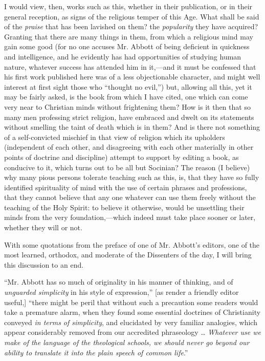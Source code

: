 I would view, then, works such as this, whether
in their publication, or in their general reception, as signs of the
religious temper of this Age. What shall be said of the \emph{praise}
that has been lavished on them? the \emph{popularity} they have
acquired? Granting that there are many things in them, from which a
religious mind may gain some good (for no one accuses Mr. Abbott of
being deficient in quickness and intelligence, and he evidently has
had opportunities of studying human nature, whatever success has
attended him in it,—and it must be confessed that his first work
published here was of a less objectionable character, and might well
interest at first sight those who ``thought no evil,'') but,
allowing all this, yet it may be fairly asked, is the book from which
I have cited, one which can come very near to Christian minds without
frightening them? How is it then that so many men professing strict
religion, have embraced and dwelt on its statements without smelling
the taint of death which is in them? And is there not something of a
self-convicted mischief in that view of religion which its upholders
(independent of each other, and disagreeing with each other materially
in other points of doctrine and discipline) attempt to support by
editing a book, as conducive to it, which turns out to be all but
Socinian? The reason (I believe) why many pious persons tolerate
teaching such as this, is, that they have so fully identified
spirituality of mind with the use of certain phrases and professions,
that they cannot believe that any one whatever can use them freely
without the teaching of the Holy Spirit: to believe it otherwise,
would be unsettling their minds from the very foundation,—which
indeed must take place sooner or later, whether they will or not.

With some quotations from the preface of one of
Mr. Abbott's editors, one of the most learned, orthodox, and
moderate of the Dissenters of the day, I will bring this discussion to
an end.

``Mr. Abbott has so much of originality in his
manner of thinking, and of \emph{unguarded simplicity} in his style of
expression,'' [as render a friendly editor useful,] ``there might be
peril that without such a precaution some readers would take a
premature alarm, when they found some essential doctrines of
Christianity conveyed \emph{in terms of simplicity}, and elucidated by
very familiar analogies, which appear considerably removed from our
accredited phraseology … \emph{Whatever use we make of the language of
the theological schools, we should never go beyond our ability to
translate it into the plain speech of common life}.''

